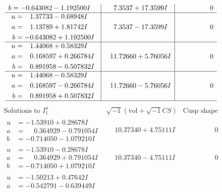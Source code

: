\documentclass[1p]{elsarticle_modified}
\theoremstyle{definition}
\newcommand{\I}{\sqrt{-1}}
\begin{document}
$$\begin{array}{c|c|c}
\begin{aligned}
b &= -0.643082 - 1.192500 I\end{aligned}
 & \phantom{-}7.3537 + 17.3599 I & \phantom{-0.000000 } 0 \\ \hline\begin{aligned}
u &= \phantom{-}1.37733 - 0.68948 I \\
a &= \phantom{-}1.13789 + 1.81742 I \\
b &= -0.643082 + 1.192500 I\end{aligned}
 & \phantom{-}7.3537 - 17.3599 I & \phantom{-0.000000 } 0 \\ \hline\begin{aligned}
u &= \phantom{-}1.44068 + 0.58329 I \\
a &= \phantom{-}0.168597 + 0.266784 I \\
b &= \phantom{-}0.891958 - 0.507832 I\end{aligned}
 & \phantom{-}11.72660 + 5.76056 I & \phantom{-0.000000 } 0 \\ \hline\begin{aligned}
u &= \phantom{-}1.44068 - 0.58329 I \\
a &= \phantom{-}0.168597 - 0.266784 I \\
b &= \phantom{-}0.891958 + 0.507832 I\end{aligned}
 & \phantom{-}11.72660 - 5.76056 I & \phantom{-0.000000 } 0\\
 \hline 
 \end{array}$$\newpage$$\begin{array}{c|c|c}  
\text{Solutions to }I^u_{1}& \I (\text{vol} + \sqrt{-1}CS) & \text{Cusp shape}\\
 \hline 
\begin{aligned}
u &= -1.53910 + 0.28678 I \\
a &= \phantom{-}0.364929 - 0.791054 I \\
b &= -0.714050 - 1.079210 I\end{aligned}
 & \phantom{-}10.37340 + 4.75111 I & \phantom{-0.000000 } 0 \\ \hline\begin{aligned}
u &= -1.53910 - 0.28678 I \\
a &= \phantom{-}0.364929 + 0.791054 I \\
b &= -0.714050 + 1.079210 I\end{aligned}
 & \phantom{-}10.37340 - 4.75111 I & \phantom{-0.000000 } 0 \\ \hline\begin{aligned}
u &= -1.50213 + 0.47642 I \\
a &= -0.542791 - 0.639449 I \\

\end{aligned}
\end{array}$$
\end{document}
